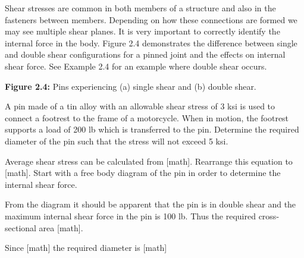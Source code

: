\documentclass[
  letterpaper,
  DIV=11,
  numbers=noendperiod]{scrreprt}
\begin{document}
Shear stresses are common in both members of a structure and also in the
fasteners between members. Depending on how these connections are formed
we may see multiple shear planes. It is very important to correctly
identify the internal force in the body. Figure 2.4 demonstrates the
difference between single and double shear configurations for a pinned
joint and the effects on internal shear force. See Example 2.4 for an
example where double shear occurs.

\textbf{Figure 2.4:} Pins experiencing (a) single shear and (b) double
shear.

\begin{tcolorbox}[enhanced jigsaw, colbacktitle=quarto-callout-note-color!10!white, title={Example 2.4: Shear stress with double shear}, coltitle=black, leftrule=.75mm, rightrule=.15mm, opacityback=0, breakable, colframe=quarto-callout-note-color-frame, left=2mm, arc=.35mm, colback=white, bottomrule=.15mm, bottomtitle=1mm, toptitle=1mm, titlerule=0mm, opacitybacktitle=0.6, toprule=.15mm]

A pin made of a tin alloy with an allowable shear stress of 3 ksi is
used to connect a footrest to the frame of a motorcycle. When in motion,
the footrest supports a load of 200 lb which is transferred to the pin.
Determine the required diameter of the pin such that the stress will not
exceed 5 ksi.

\begin{tcolorbox}[enhanced jigsaw, colbacktitle=quarto-callout-note-color!10!white, title={Solution}, coltitle=black, leftrule=.75mm, rightrule=.15mm, opacityback=0, breakable, colframe=quarto-callout-note-color-frame, left=2mm, arc=.35mm, colback=white, bottomrule=.15mm, bottomtitle=1mm, toptitle=1mm, titlerule=0mm, opacitybacktitle=0.6, toprule=.15mm]

Average shear stress can be calculated from {[}math{]}. Rearrange this
equation to {[}math{]}. Start with a free body diagram of the pin in
order to determine the internal shear force.

From the diagram it should be apparent that the pin is in double shear
and the maximum internal shear force in the pin is 100 lb. Thus the
required cross-sectional area {[}math{]}.

Since {[}math{]} the required diameter is {[}math{]}

\end{tcolorbox}

\end{tcolorbox}
\end{document}
